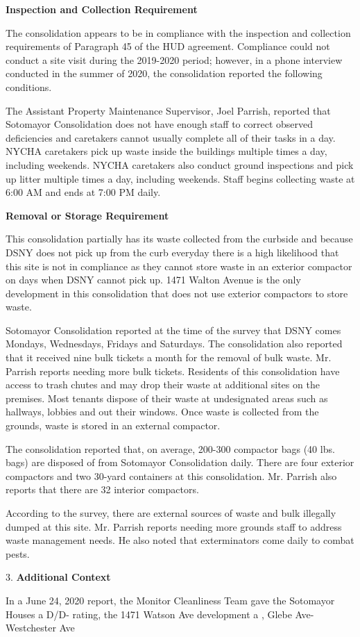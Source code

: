 

\textbf{Inspection and Collection Requirement}

The consolidation appears to be in compliance with the inspection and collection requirements of Paragraph 45 of the HUD agreement. Compliance could not conduct a site visit during the 2019-2020 period; however, in a phone interview conducted in the summer of 2020, the consolidation reported the following conditions.

The Assistant Property Maintenance Supervisor, Joel Parrish, reported that Sotomayor Consolidation does not have enough staff to correct observed deficiencies and caretakers cannot usually complete all of their tasks in a day. NYCHA caretakers pick up waste inside the buildings multiple times a day, including weekends. NYCHA caretakers also conduct ground inspections and pick up litter multiple times a day, including weekends. Staff begins collecting waste at 6:00 AM and ends at 7:00 PM daily. 

\textbf{Removal or Storage Requirement}

This consolidation partially has its waste collected from the curbside and because DSNY does not pick up from the curb everyday there is a high likelihood that this site is not in compliance as they cannot store waste in an exterior compactor on days when DSNY cannot pick up. 1471 Walton Avenue is the only development in this consolidation that does not use exterior compactors to store waste.

Sotomayor Consolidation reported at the time of the survey that DSNY comes Mondays, Wednesdays, Fridays and Saturdays. The consolidation also reported that it received nine bulk tickets a month for the removal of bulk waste. Mr. Parrish reports needing more bulk tickets. Residents of this consolidation have access to trash chutes and may drop their waste at additional sites on the premises. Most tenants dispose of their waste at undesignated areas such as hallways, lobbies and out their windows. Once waste is collected from the grounds, waste is stored in an external compactor. 

The consolidation reported that, on average, 200-300 compactor bags (40 lbs. bags) are disposed of from Sotomayor Consolidation daily. There are four exterior compactors and two 30-yard containers at this consolidation. Mr. Parrish also reports that there are 32 interior compactors.

According to the survey, there are external sources of waste and bulk illegally dumped at this site.  Mr. Parrish reports needing more grounds staff to address waste management needs. He also noted that exterminators come daily to combat pests.

3. \textbf{Additional Context} 

In a June 24, 2020 report, the Monitor Cleanliness Team gave the Sotomayor Houses a D/D- rating, the 1471 Watson Ave development a , Glebe Ave-Westchester Ave 
